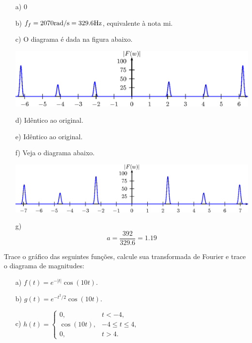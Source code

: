 \begin{resp}
\begin{itemize}
\item[a)] 0
\item[b)] $f_f=2070 \hbox{rad/s}=329.6 \hbox{Hz}$, equivalente à nota mi.
\item[c)] O diagrama é dada na figura abaixo.
\begin{center}
\includegraphics{cap_propriedades_transformada/pics/figura_22}\end{center}
\item[d)] Idêntico ao original.
\item[e)] Idêntico ao original.
\item[f)] Veja o diagrama abaixo.
\begin{center}
\includegraphics{cap_propriedades_transformada/pics/figura_23}\end{center}
\item[g)] \begin{equation}a=\frac{392}{329.6}=1.19\end{equation}
\end{itemize}
\end{resp}
\begin{exer} Trace o gráfico das seguintes funções, calcule sua transformada de Fourier e trace o diagrama de magnitudes: 
\begin{itemize}
\item[a)] $f(t)=e^{-|t|}\cos(10t)$.
\item[b)] $g(t)=e^{-t^2/2}\cos(10t)$.
\item[c)] $h(t)=\left\{
\begin{array}{ll}
0, &t<-4,\\
\cos(10t), &-4\leq t \leq 4,\\
0,&t>4.
\end{array} \right.$
\end{itemize}
\end{exer}
